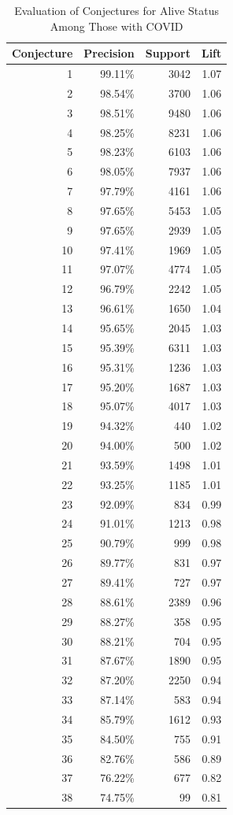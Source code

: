 \documentclass[ijds,nonblindrev]{informs-ijds}
\begin{document}
\begin{APPENDICES}
 \begin{table}[!ht]
 \caption{\label{alivestats}Evaluation of Conjectures for Alive Status Among Those with COVID}
 \centering
 \begin{tabular}{rrrr}
Conjecture & Precision & Support & Lift\\
\hline
1 & 99.11\% & 3042 & 1.07\\
2 & 98.54\% & 3700 & 1.06\\
3 & 98.51\% & 9480 & 1.06\\
4 & 98.25\% & 8231 & 1.06\\
5 & 98.23\% & 6103 & 1.06\\
6 & 98.05\% & 7937 & 1.06\\
7 & 97.79\% & 4161 & 1.06\\
8 & 97.65\% & 5453 & 1.05\\
9 & 97.65\% & 2939 & 1.05\\
10 & 97.41\% & 1969 & 1.05\\
11 & 97.07\% & 4774 & 1.05\\
12 & 96.79\% & 2242 & 1.05\\
13 & 96.61\% & 1650 & 1.04\\
14 & 95.65\% & 2045 & 1.03\\
15 & 95.39\% & 6311 & 1.03\\
16 & 95.31\% & 1236 & 1.03\\
17 & 95.20\% & 1687 & 1.03\\
18 & 95.07\% & 4017 & 1.03\\
19 & 94.32\% & 440 & 1.02\\
20 & 94.00\% & 500 & 1.02\\
21 & 93.59\% & 1498 & 1.01\\
22 & 93.25\% & 1185 & 1.01\\
23 & 92.09\% & 834 & 0.99\\
24 & 91.01\% & 1213 & 0.98\\
25 & 90.79\% & 999 & 0.98\\
26 & 89.77\% & 831 & 0.97\\
27 & 89.41\% & 727 & 0.97\\
28 & 88.61\% & 2389 & 0.96\\
29 & 88.27\% & 358 & 0.95\\
30 & 88.21\% & 704 & 0.95\\
31 & 87.67\% & 1890 & 0.95\\
32 & 87.20\% & 2250 & 0.94\\
33 & 87.14\% & 583 & 0.94\\
34 & 85.79\% & 1612 & 0.93\\
35 & 84.50\% & 755 & 0.91\\
36 & 82.76\% & 586 & 0.89\\
37 & 76.22\% & 677 & 0.82\\
38 & 74.75\% & 99 & 0.81 \\ \hline
\end{tabular}
\end{table}
 

\end{APPENDICES}
\end{document}

